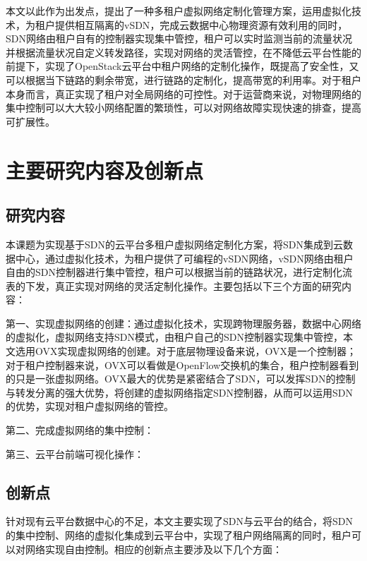 本文以此作为出发点，提出了一种多租户虚拟网络定制化管理方案，运用虚拟化技术，为租户提供相互隔离的\gls*{vSDN}，完成云数据中心物理资源有效利用的同时，\gls*{SDN}网络由租户自有的控制器实现集中管控，租户可以实时监测当前的流量状况并根据流量状况自定义转发路径，实现对网络的灵活管控，在不降低云平台性能的前提下，实现了OpenStack云平台中租户网络的定制化操作，既提高了安全性，又可以根据当下链路的剩余带宽，进行链路的定制化，提高带宽的利用率。对于租户本身而言，真正实现了租户对全局网络的可控性。对于运营商来说，对物理网络的集中控制可以大大较小网络配置的繁琐性，可以对网络故障实现快速的排查，提高可扩展性。

\section{主要研究内容及创新点}
\subsection{研究内容}
本课题为实现基于\gls*{SDN}的云平台多租户虚拟网络定制化方案，将\gls*{SDN}集成到云数据中心，通过虚拟化技术，为租户提供了可编程的\gls*{vSDN}网络，\gls*{vSDN}网络由租户自由的\gls*{SDN}控制器进行集中管控，租户可以根据当前的链路状况，进行定制化流表的下发，真正实现对网络的灵活定制化操作。主要包括以下三个方面的研究内容：

第一、实现虚拟网络的创建：通过虚拟化技术，实现跨物理服务器，数据中心网络的虚拟化，虚拟网络支持SDN模式，由租户自己的SDN控制器实现集中管控，本文选用\gls*{OVX}\cite{OVX-1}实现虚拟网络的创建。对于底层物理设备来说，OVX是一个控制器；对于租户控制器来说，OVX可以看做是OpenFlow交换机的集合，租户控制器看到的只是一张虚拟网络。OVX最大的优势是紧密结合了SDN，可以发挥SDN的控制与转发分离的强大优势，将创建的虚拟网络指定SDN控制器，从而可以运用SDN的优势，实现对租户虚拟网络的管控。

第二、完成虚拟网络的集中控制：

第三、云平台前端可视化操作：

\subsection{创新点}
针对现有云平台数据中心的不足，本文主要实现了SDN与云平台的结合，将SDN的集中控制、网络的虚拟化集成到云平台中，实现了租户网络隔离的同时，租户可以对网络实现自由控制。相应的创新点主要涉及以下几个方面：

